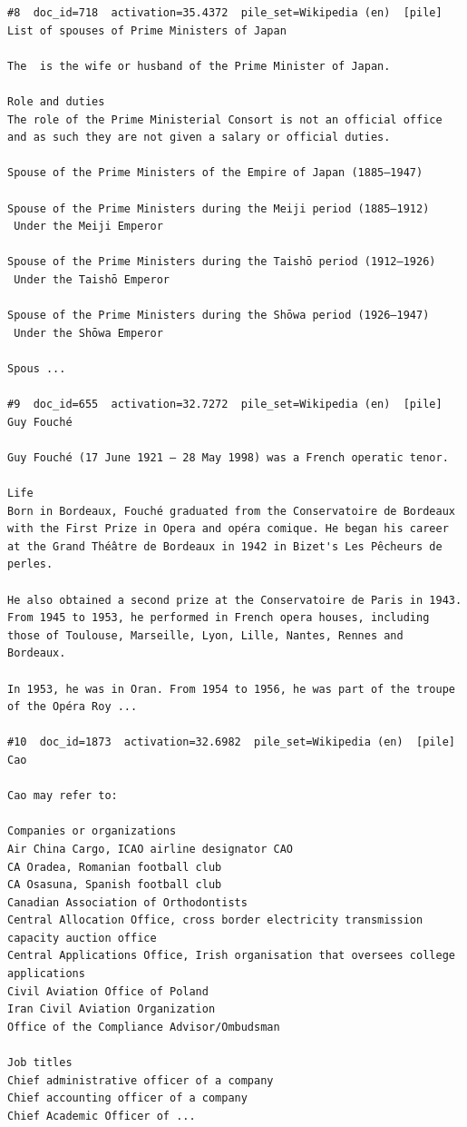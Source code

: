 \begin{verbatim}
#8  doc_id=718  activation=35.4372  pile_set=Wikipedia (en)  [pile]
List of spouses of Prime Ministers of Japan

The  is the wife or husband of the Prime Minister of Japan.

Role and duties
The role of the Prime Ministerial Consort is not an official office and as such they are not given a salary or official duties.

Spouse of the Prime Ministers of the Empire of Japan (1885–1947)

Spouse of the Prime Ministers during the Meiji period (1885–1912)
 Under the Meiji Emperor

Spouse of the Prime Ministers during the Taishō period (1912–1926)
 Under the Taishō Emperor

Spouse of the Prime Ministers during the Shōwa period (1926–1947)
 Under the Shōwa Emperor

Spous ...

#9  doc_id=655  activation=32.7272  pile_set=Wikipedia (en)  [pile]
Guy Fouché

Guy Fouché (17 June 1921 – 28 May 1998) was a French operatic tenor.

Life 
Born in Bordeaux, Fouché graduated from the Conservatoire de Bordeaux with the First Prize in Opera and opéra comique. He began his career at the Grand Théâtre de Bordeaux in 1942 in Bizet's Les Pêcheurs de perles.

He also obtained a second prize at the Conservatoire de Paris in 1943. From 1945 to 1953, he performed in French opera houses, including those of Toulouse, Marseille, Lyon, Lille, Nantes, Rennes and Bordeaux.

In 1953, he was in Oran. From 1954 to 1956, he was part of the troupe of the Opéra Roy ...

#10  doc_id=1873  activation=32.6982  pile_set=Wikipedia (en)  [pile]
Cao

Cao may refer to:

Companies or organizations
Air China Cargo, ICAO airline designator CAO
CA Oradea, Romanian football club 
CA Osasuna, Spanish football club
Canadian Association of Orthodontists
Central Allocation Office, cross border electricity transmission capacity auction office
Central Applications Office, Irish organisation that oversees college applications
Civil Aviation Office of Poland
Iran Civil Aviation Organization
Office of the Compliance Advisor/Ombudsman

Job titles
Chief administrative officer of a company
Chief accounting officer of a company
Chief Academic Officer of ...

\end{verbatim}

